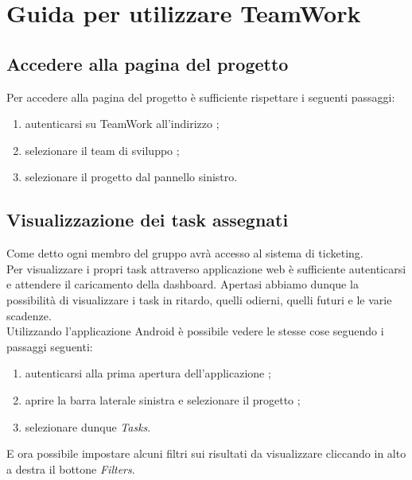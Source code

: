 \section{Guida per utilizzare TeamWork} \label{sec:teamwork}
		\subsection{Accedere alla pagina del progetto}
			Per accedere alla pagina del progetto è sufficiente rispettare i seguenti passaggi:
			\begin{enumerate}
				\item autenticarsi su TeamWork all'indirizzo ;
				\item selezionare il team di sviluppo \groupname{};
				\item selezionare il progetto \projectname{} dal pannello sinistro.
			\end{enumerate}
			
		\subsection{Visualizzazione dei task assegnati}
			Come detto ogni membro del gruppo \groupname{} avrà accesso al sistema di ticketing.\\
			Per visualizzare i propri task attraverso applicazione web è sufficiente autenticarsi e attendere il caricamento della dashboard. Apertasi abbiamo dunque la possibilità di visualizzare i task in ritardo, quelli odierni, quelli futuri e le varie scadenze.\\
			
Utilizzando l'applicazione Android è possibile vedere le stesse cose seguendo i passaggi seguenti:
			\begin{enumerate}
				\item autenticarsi alla prima apertura dell'applicazione ;
				\item aprire la barra laterale sinistra e selezionare il progetto \projectname{};
				\item selezionare dunque \textit{Tasks}.
			\end{enumerate}
			E ora possibile impostare alcuni filtri sui risultati da visualizzare cliccando in alto a destra il bottone  \textit{Filters}.

